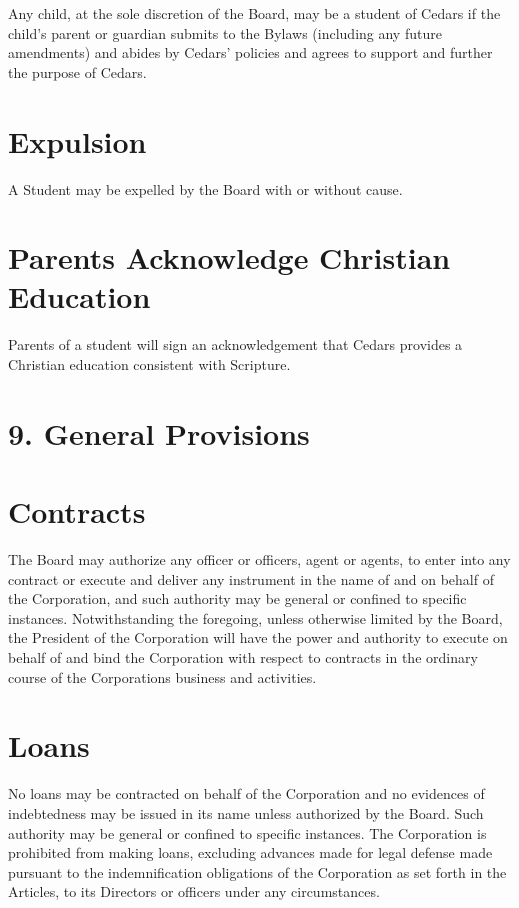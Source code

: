 \documentclass[
]{book}
\begin{document}
Any child, at the sole discretion of the Board, may be a student of Cedars if the child's parent or guardian submits to the Bylaws (including any future amendments) and abides by Cedars' policies and agrees to support and further the purpose of Cedars.

\section{Expulsion}\label{expulsion}

A Student may be expelled by the Board with or without cause.

\section{Parents Acknowledge Christian Education}\label{parents-acknowledge-christian-education}

Parents of a student will sign an acknowledgement that Cedars provides a Christian education consistent with Scripture.

\section{9. General Provisions}\label{general-provisions}

\section{Contracts}\label{contracts}

The Board may authorize any officer or officers, agent or agents, to enter into any contract or execute and deliver any instrument in the name of and on behalf of the Corporation, and such authority may be general or confined to specific instances. Notwithstanding the foregoing, unless otherwise limited by the Board, the President of the Corporation will have the power and authority to execute on behalf of and bind the Corporation with respect to contracts in the ordinary course of the Corporation\textquotesingle s business and activities.

\section{Loans}\label{loans}

No loans may be contracted on behalf of the Corporation and no evidences of indebtedness may be issued in its name unless authorized by the Board. Such authority may be general or confined to specific instances. The Corporation is prohibited from making loans, excluding advances made for legal defense made pursuant to the indemnification obligations of the Corporation as set forth in the Articles, to its Directors or officers under any circumstances.
\end{document}
